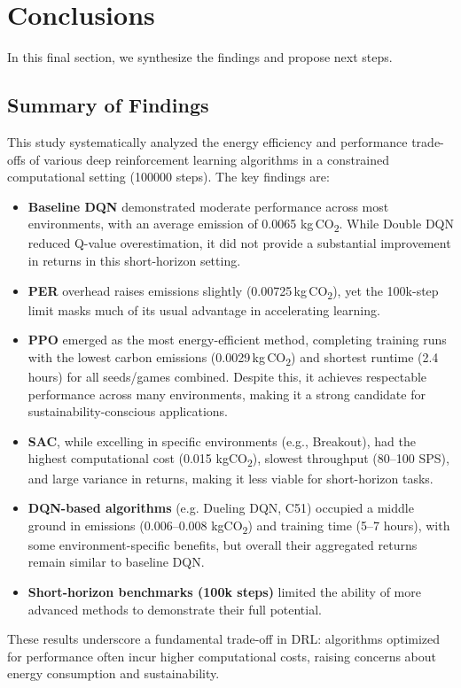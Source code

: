 \section{Conclusions}
\label{sec:conclusions}
In this final section, we synthesize the findings and propose next steps.

\subsection{Summary of Findings}
\label{subsec:summary_of_findings}
This study systematically analyzed the energy efficiency and performance trade-offs of various deep reinforcement learning algorithms in a constrained computational setting (\num{100000} steps). The key findings are:
\begin{itemize}
	\item \textbf{Baseline DQN} demonstrated moderate performance across most environments, with an average emission of \num{0.0065} kg\,CO\textsubscript{2}. While Double DQN reduced Q-value overestimation, it did not provide a substantial improvement in returns  in this short-horizon setting.
	\item \textbf{PER} overhead raises emissions slightly (\num{0.00725}\,kg\,CO\textsubscript{2}), yet the 100k-step limit masks much of its usual advantage in accelerating learning.
	\item \textbf{PPO} emerged as the most energy-efficient method, completing training runs with the lowest carbon emissions (\num{0.0029}\,kg\,CO\textsubscript{2}) and shortest runtime (\num{2.4} hours) for all seeds/games combined. Despite this, it achieves respectable performance across many environments, making it a strong candidate for sustainability-conscious applications.
	\item \textbf{SAC}, while excelling in specific environments (e.g., Breakout), had the highest computational cost (\num{0.015} kgCO\textsubscript{2}), slowest throughput (\num{80}–\num{100} SPS), and large variance in returns, making it less viable for short-horizon tasks.
	\item \textbf{DQN-based algorithms} (e.g. Dueling DQN, C51) occupied a middle ground in emissions (\num{0.006}–\num{0.008} kgCO\textsubscript{2}) and training time (\num{5}–\num{7} hours), with some environment-specific benefits, but overall their aggregated returns remain similar to baseline DQN.
	\item \textbf{Short-horizon benchmarks (100k steps)} limited the ability of more advanced methods to demonstrate their full potential.
\end{itemize}
These results underscore a fundamental trade-off in DRL: algorithms optimized for performance often incur higher computational costs, raising concerns about energy consumption and sustainability.

